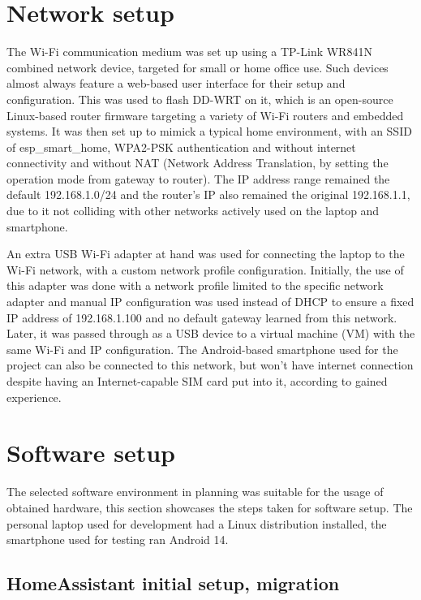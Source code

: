 \section{Network setup}

The Wi-Fi communication medium was set up using a TP-Link WR841N combined network device, targeted for small or home office use. Such devices almost always feature a web-based user interface for their setup and configuration. This was used to flash DD-WRT on it, which is an open-source Linux-based router firmware targeting a variety of Wi-Fi routers and embedded systems. \cite{DDWRTHomepage} It was then set up to mimick a typical home environment, with an SSID of esp\_smart\_home, WPA2-PSK authentication and without internet connectivity and without NAT (Network Address Translation, by setting the operation mode from gateway to router). The IP address range remained the default 192.168.1.0/24 and the router's IP also remained the original 192.168.1.1, due to it not colliding with other networks actively used on the laptop and smartphone.

An extra USB Wi-Fi adapter at hand was used for connecting the laptop to the Wi-Fi network, with a custom network profile configuration. Initially, the use of this adapter was done with a network profile limited to the specific network adapter and manual IP configuration was used instead of DHCP to ensure a fixed IP address of 192.168.1.100 and no default gateway learned from this network. Later, it was passed through as a USB device to a virtual machine (VM) with the same Wi-Fi and IP configuration. The Android-based smartphone used for the project can also be connected to this network, but won't have internet connection despite having an Internet-capable SIM card put into it, according to gained experience.

\section{Software setup}

The selected software environment in planning was suitable for the usage of obtained hardware, this section showcases the steps taken for software setup. The personal laptop used for development had a Linux distribution installed, the smartphone used for testing ran Android 14. 

\subsection{HomeAssistant initial setup, migration}

